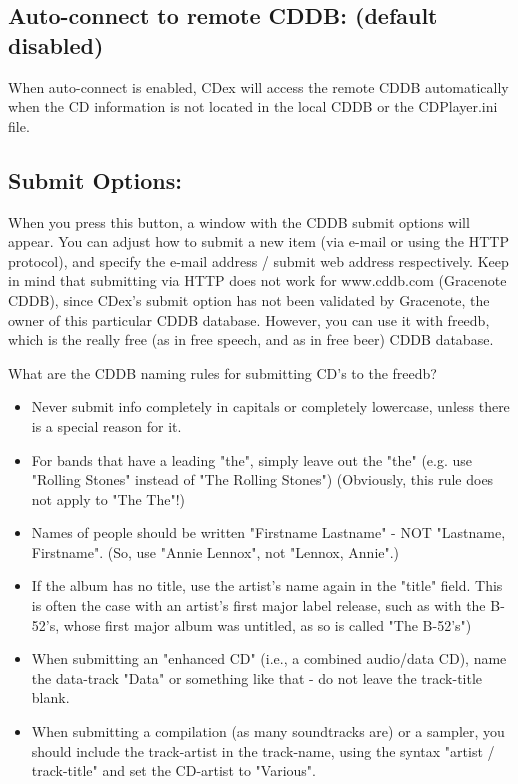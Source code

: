 \subsection{Auto-connect to remote CDDB: (default disabled)}

When auto-connect is enabled, CDex will access the remote CDDB automatically
when the CD information is not located in the local CDDB or the CDPlayer.ini
file.

\subsection{Submit Options:}

When you press this button, a window with the CDDB submit options will appear. You can
adjust how to submit a new item (via e-mail or using the HTTP protocol), and specify
the e-mail address / submit web address respectively. Keep in mind that submitting via
HTTP does not work for www.cddb.com (Gracenote CDDB), since CDex's submit option has not been validated by
Gracenote, the owner of this particular CDDB database. However, you can use it with
freedb, which is the really free (as in free speech, and as in free beer) CDDB database.

What are the CDDB naming rules for submitting CD's to the freedb?

\begin{itemize}
\itemsep=0pt
\item Never submit info completely in capitals or completely lowercase, unless there is a special reason for it.
\item For bands that have a leading "the", simply leave out the "the" (e.g. use "Rolling Stones" instead of "The Rolling Stones") (Obviously, this rule does not apply to "The The"!)
\item Names of people should be written "Firstname Lastname" - NOT "Lastname, Firstname".  (So, use "Annie Lennox", not "Lennox, Annie".)
\item If the album has no title, use the artist's name again in the "title" field.  This is often the case with an artist's first major label release, such as with the B-52's, whose first major album was untitled, as so is called "The B-52's")
\item When submitting an "enhanced CD" (i.e., a combined audio/data CD), name the data-track "Data" or something like that - do not leave the track-title blank.
\item When submitting a compilation (as many soundtracks are) or a sampler, you should include the track-artist in the track-name, using the syntax "artist / track-title" and set the CD-artist to "Various".
\end{itemize}



